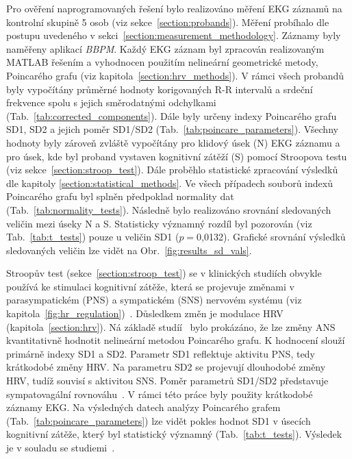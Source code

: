 Pro ověření naprogramovaných řešení bylo realizováno měření EKG záznamů na
kontrolní skupině 5 osob (viz sekce~\ref{section:probands}). Měření probíhalo
dle postupu uvedeného v sekci~\ref{section:measurement_methodology}. Záznamy
byly naměřeny aplikací \textit{BBPM}. Každý EKG záznam byl zpracován
realizovaným MATLAB řešením a vyhodnocen použitím nelineární
geometrické metody, Poincarého grafu (viz kapitola~\ref{section:hrv_methods}). V
rámci všech probandů byly vypočítány průměrné hodnoty korigovaných R-R intervalů
a srdeční frekvence spolu s jejich směrodatnými odchylkami
(Tab.~\ref{tab:corrected_components}). Dále byly určeny indexy Poincarého grafu
SD1, SD2 a jejich poměr SD1/SD2 (Tab.~\ref{tab:poincare_parameters}). Všechny hodnoty byly
zároveň zvláště vypočítány pro klidový úsek (N) EKG záznamu a pro úsek, kde byl
proband vystaven kognitivní zátěží (S) pomocí Stroopova testu (viz
sekce~\ref{section:stroop_test}). Dále proběhlo statistické zpracování výsledků
dle kapitoly \ref{section:statistical_methods}. Ve všech případech souborů
indexů Poincarého grafu byl splněn předpoklad normality dat
(Tab.~\ref{tab:normality_tests}). Následně bylo realizováno srovnání sledovaných
veličin mezi úseky N a S. Statisticky významný rozdíl byl pozorován (viz
Tab.~\ref{tab:t_tests}) pouze u veličin SD1 ($p=$0,0132). Grafické srovnání
výsledků sledovaných veličin lze vidět na Obr.~\ref{fig:results_sd_vals}.

Stroopův test (sekce~\ref{section:stroop_test}) se v klinických studiích obvykle
používá ke stimulaci kognitivní zátěže, která se projevuje změnami v
parasympatickém (PNS) a sympatickém (SNS) nervovém systému (viz
kapitola~\ref{fig:hr_regulation})~\cite{Hoshikawa1997}. Důsledkem změn je
modulace HRV (kapitola~\ref{section:hrv}). Ná základě
studíí~\cite{Brennan2001,Kamen1996} bylo prokázáno, že lze změny ANS
kvantitativně hodnotit nelineární metodou Poincarého grafu. K hodnocení slouží
primárně indexy SD1 a SD2. Parametr SD1 reflektuje aktivitu PNS, tedy krátkodobé
změny HRV. Na parametru SD2 se projevují dlouhodobé změny HRV, tudíž souvisí s
aktivitou SNS. Poměr parametrů SD1/SD2 představuje sympatovagální
rovnováhu~\cite{Hsu2012,Habib2013,Mazhar2007}. V rámci této práce byly použity
krátkodobé záznamy EKG. Na výsledných datech analýzy Poincarého grafem
(Tab.~\ref{tab:poincare_parameters}) lze vidět pokles hodnot SD1 v úsecích
kognitivní zátěže, který byl statistický významný (Tab.~\ref{tab:t_tests}).
Výsledek je v souladu se
studiemi~\cite{Sebastiano2019,Brugnera2018,Vazan2017,Melillo2011}.




















